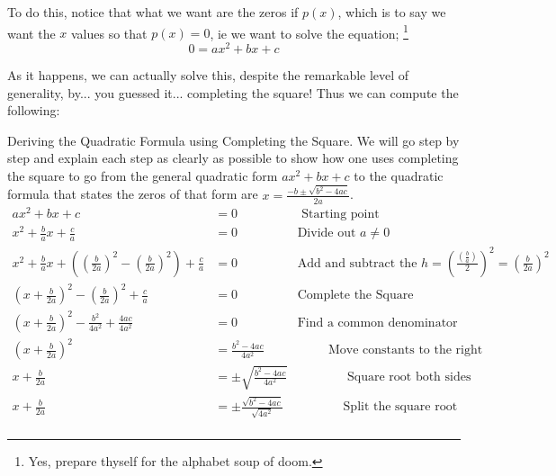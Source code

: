 \documentclass{ximeraXloud}
\begin{document}
        To do this, notice that what we want are the zeros if $p(x)$, which is to say we want the $x$ values so that $p(x) = 0$, ie we want to solve the equation;%
        \footnote{Yes, prepare thyself for the alphabet soup of doom.}
        \[
            0 = ax^2 + bx + c
        \]
        
        As it happens, we can actually solve this, despite the remarkable level of generality, by... you guessed it... completing the square! Thus we can compute the following:
        
        \begin{example}%
            Deriving the Quadratic Formula using Completing the Square. We will go step by step and explain each step as clearly as possible to show how one uses completing the square to go from the general quadratic form $ax^2 + bx + c$ to the quadratic formula that states the zeros of that form are $x = \frac{-b \pm \sqrt{b^2-4ac}}{2a}$.
            \begin{align*}
                ax^2 + bx + c & = 0  \hspace{2cm} \text{ Starting point}    \\
                x^2 + \frac{b}{a}x + \frac{c}{a} & = 0    \hspace{2cm} \text{Divide out }a \neq 0  \\
                x^2 + \frac{b}{a}x + \left(\left(\frac{b}{2a}\right)^2 - \left(\frac{b}{2a}\right)^2\right) + \frac{c}{a} & = 0  \hspace{2cm} \text{Add and subtract the $h = \left(\frac{\left(\frac{b}{a}\right)}{2}\right)^2 = \left(\frac{b}{2a}\right)^2$ }    \\
                \left(x + \frac{b}{2a}\right)^2 - \left(\frac{b}{2a}\right)^2 + \frac{c}{a} & = 0    \hspace{2cm} \text{Complete the Square} \\
                \left( x + \frac{b}{2a}\right)^2 - \frac{b^2}{4a^2} + \frac{4ac}{4a^2} & = 0  \hspace{2cm} \text{Find a common denominator}\\
                \left(x + \frac{b}{2a}\right)^2 & = \frac{b^2-4ac}{4a^2} \hspace{2cm} \text{ Move constants to the right} \\
                x + \frac{b}{2a} & = \pm \sqrt{\frac{b^2-4ac}{4a^2}} \hspace{2cm} \text{Square root both sides} \\
                x + \frac{b}{2a} & = \pm \frac{\sqrt{b^2-4ac}}{\sqrt{4a^2}} \hspace{2cm} \text{Split the square root} \\

\end{align*}
\end{example}
\end{document}
